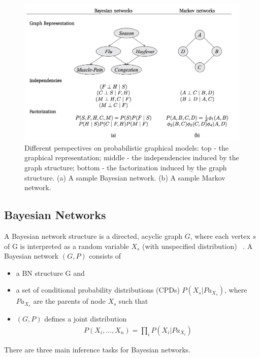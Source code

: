 \begin{figure}
    \centering
    \includegraphics[width=\textwidth]{figures/pgm.png}
    \caption{Different perspectives on probabilistic graphical models: top - the graphical representation; middle - the independencies induced by the graph structure; bottom - the factorization induced by the graph structure. (a) A sample Bayesian network. (b) A sample Markov network.}
    \label{fig:pgm}
\end{figure}


\subsection{Bayesian Networks}
A Bayesian network structure is a directed, acyclic graph $G$, where each vertex $s$ of G is interpreted as a random variable $X_s$ (with unspecified distribution) ~\cite{heckerman}.
A Bayesian network $(G, P)$ consists of
\begin{itemize}
  \item a BN structure G and
  \item a set of conditional probability distributions (CPDs) $P(X_s | Pa_{X_s})$, where $Pa_{X_s}$ are the parents of node $X_s$ such that 
  \item $(G, P)$ defines a joint distribution
  \begin{align*}
    P(X_i, \dots, X_n) = \prod_i P(X_i | Pa_{X_i})
  \end{align*}
\end{itemize}
There are three main inference tasks for Bayesian networks.

